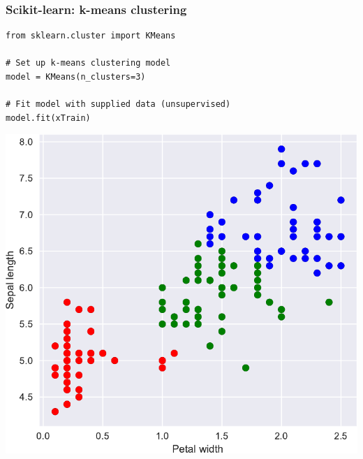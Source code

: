 \documentclass[pdf]{beamer}
\begin{document}
\begin{frame}[fragile]
\frametitle{Scikit-learn: k-means clustering}

\begin{lstlisting}[style=python]
from sklearn.cluster import KMeans

# Set up k-means clustering model
model = KMeans(n_clusters=3)

# Fit model with supplied data (unsupervised)
model.fit(xTrain)
\end{lstlisting}


            


\vspace{-0.5cm}
\centering
\includegraphics[width=.45\textwidth]{kmeans2.pdf}

\end{frame}
\end{document}
